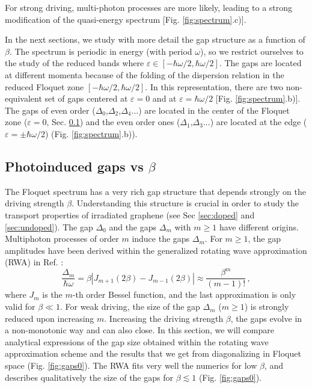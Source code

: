 \documentclass[aps,prb,showpacs,superscriptaddress,twocolumn,10pt,floatfix]{revtex4-1}
\newcommand{\ep}{\varepsilon}
\begin{document}
For strong driving, multi-photon processes are more likely, leading to a strong modification of the quasi-energy spectrum [Fig. \ref{fig:spectrum}.c)]. 

In the next sections, we study with more detail the gap structure as a function of $\beta$. The spectrum is periodic in energy (with period $\omega$), so we restrict ourselves to the study of the reduced bands where $\ep\in[-\hbar\omega/2,\hbar\omega/2]$. The gaps are located at different momenta because of the folding of the dispersion relation in the reduced Floquet zone $[-\hbar\omega/2,\hbar\omega/2]$. In this representation, there are two non-equivalent set of gaps centered at $\ep=0$ and at $\ep=\hbar\omega/2$ [Fig. \ref{fig:spectrum}.b)]. The gaps of even order ($\Delta_0$,$\Delta_2$,$\Delta_4$...) are located in the center of the Floquet zone ($\ep=0$, Sec. \ref{sec:gaps0}) and the even order ones ($\Delta_1$,$\Delta_3$...) are located at the edge  ($\ep=\pm\hbar\omega/2$) (Fig. \ref{fig:spectrum}.b)).

\subsection{Photoinduced gaps vs $\beta$}

\label{sec:gaps0}

The Floquet spectrum has a very rich gap structure\cite{Perez-Piskunow2015} that depends strongly on the driving strength $\beta$. Understanding this structure is crucial in order to study the transport properties of irradiated graphene (see Sec \ref{sec:doped} and \ref{sec:undoped}). The gap $\Delta_0$ and the gaps $\Delta_m$ with $m\geqslant1$ have different origins. Multiphoton processes of order $m$ induce the gaps $\Delta_m$. For $m \geqslant 1$, the gap amplitudes have been derived within the generalized rotating wave approximation (RWA) in Ref. :
\begin{equation}
\frac{\Delta_m}{\hbar\omega}=\beta|J_{m+1}(2\beta)-J_{m-1}(2\beta)|\approx\frac{\beta^m}{(m-1)!} \, ,
\label{eq:gapm}
\end{equation}
where $J_m$ is the $m$-th order Bessel function, and the last approximation is only valid for $\beta\ll 1$. For weak driving, the size of the gap $\Delta_m$ ($m\geqslant 1$) is strongly reduced upon increasing $m$. Increasing the driving strength $\beta$, the gaps evolve in a non-monotonic way and can also close. In this section, we will compare analytical expressions of the gap size obtained within the rotating wave approximation scheme and the results that we get from diagonalizing in Floquet space (Fig. \ref{fig:gaps0}).  The RWA fits very well the numerics for low $\beta$, and describes qualitatively the size of the gaps for $\beta \lesssim 1$ (Fig. \ref{fig:gaps0}). 
\end{document}
